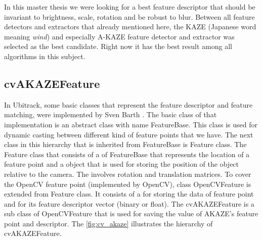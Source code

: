 
In this master thesis we were looking for a best feature descriptor that should be invariant to brightness, scale, rotation and be robust to blur. Between all feature detectors and extractors that already mentioned here, the KAZE (Japanese word meaning \emph{wind}) and especially A-KAZE feature detector and extractor was selected as the best candidate. Right now it has the best result among all algorithms in this subject.

\subsection {cvAKAZEFeature} \label{subsec:cv_akaze_feature}
In Ubitrack, some basic classes that represent the feature descriptor and feature matching, were implemented by Sven Barth \cite{barth2014marker}. The basic class of that implementation is an abstract class with name FeatureBase. This class is used for dynamic casting between different kind of feature points that we have.
The next class in this hierarchy that is inherited from FeatureBase is Feature class. The Feature class that consists of a   of FeatureBase that represents the location of a feature point and a  object that is used for storing the position of the object relative to the camera. The  involves rotation and translation matrices. To cover the OpenCV feature point (implemented by OpenCV), class OpenCVFeature is extended from Feature class. It consists of a  for storing the data of feature point and  for its feature descriptor vector (binary or float). The cvAKAZEFeature is a sub class of OpenCVFeature that is used for saving the value of AKAZE's feature point and descriptor. The \autoref{fig:cv_akaze} illustrates the hierarchy of cvAKAZEFeature.

